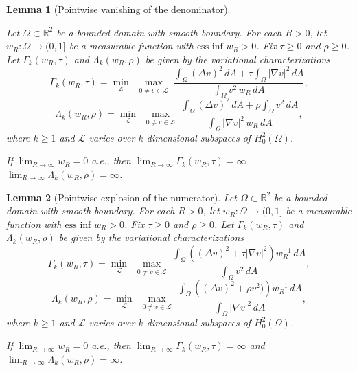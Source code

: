 \documentclass[10pt,a4paper]{amsart}
\newtheorem{lemma}{Lemma}
\newcommand{\R}{\mathbb{R}}
\begin{document}
\begin{lemma}[Pointwise vanishing of the denominator]\label{lem:ptwisevanfourthorder}

Let $\Omega \subset \R^2$ be a bounded domain with smooth boundary. For each $R > 0$, let $w_R:\Omega \to (0,1]$ be a measurable function with $\text{ess inf } w_R > 0$. Fix $\tau \geq 0$ and $\rho \geq 0$. Let $\Gamma_k(w_R,\tau)$ and $\Lambda_k(w_R,\rho)$ be given by the variational characterizations
$$
\Gamma_k(w_R,\tau)
=
\min_{\mathcal L}\ \max_{\substack{0\neq v\in \mathcal L}}
\frac{\displaystyle \int_\Omega (\Delta v)^2\,dA + \tau \int_\Omega |\nabla v|^2\,dA}
{\displaystyle \int_\Omega v^2\,w_R\,dA},
$$
$$
\Lambda_k(w_R,\rho)
=
\min_{\mathcal L}\ \max_{\substack{0\neq v\in \mathcal L}}
\frac{\displaystyle \int_\Omega (\Delta v)^2\,dA + \rho \int_\Omega v^2\,dA}
{\displaystyle \int_\Omega |\nabla v|^2\,w_R\,dA},
$$
where $k \geq 1$ and $\mathcal L$ varies over $k$-dimensional subspaces of $H_0^2(\Omega)$. 

If $\lim_{R\to\infty} w_R = 0$ a.e., then $\lim_{R\to\infty} \Gamma_k(w_R,\tau)=\infty$ $\lim_{R\to\infty} \Lambda_k(w_R,\rho)=\infty$.
\end{lemma}

\begin{lemma}[Pointwise explosion of the numerator]\label{lem:ptwisevanfourthorder--numer}
Let $\Omega \subset \R^2$ be a bounded domain with smooth boundary. For each $R > 0$, let $w_R: \Omega\to (0,1]$ be a measurable function with $\text{ess inf } w_R > 0$. Fix $\tau \geq 0$ and $\rho \geq 0$. Let $\Gamma_k(w_R, \tau)$ and $\Lambda_k(w_R, \rho)$ be given by the variational characterizations
$$
\Gamma_k(w_R, \tau)
= \min_{\mathcal L}\ \max_{\substack{0\neq v\in\mathcal L}}
\frac{\displaystyle \int_{\Omega}\left((\Delta v)^2 + \tau |\nabla v|^2\right)w_R^{-1}\,dA}{\displaystyle \int_{\Omega} v^2\,dA},
$$
$$
\Lambda_k(w_R, \rho)
= \min_{\mathcal L}\ \max_{\substack{0\neq v\in\mathcal L}}
\frac{\displaystyle \int_{\Omega}\left((\Delta v)^2 + \rho v^2)\right)w_R^{-1}\,dA}{\displaystyle \int_{\Omega} |\nabla v|^2\,dA},
$$
where $k \geq 1$ and $\mathcal L$ varies over $k$-dimensional subspaces of $H_0^2(\Omega)$. 

If $\lim_{R\to\infty} w_R = 0$ a.e., then $\lim_{R\to\infty} \Gamma_k(w_R,\tau)=\infty$ and $\lim_{R\to\infty} \Lambda_k(w_R,\rho)=\infty$.
\end{lemma}
\end{document}
